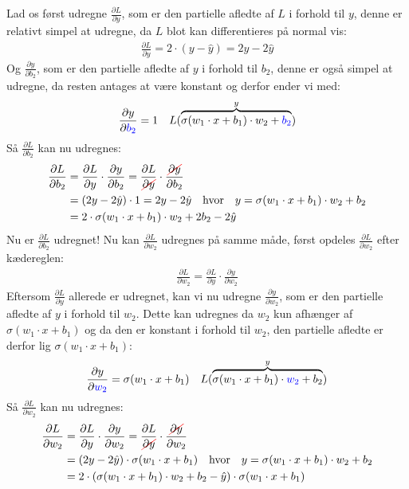 \documentclass{article}
\newcommand\Ccancel[2][black]{
    \let\OldcancelColor\CancelColor
    \renewcommand\CancelColor{\color{#1}}
    \cancel{#2}
    \renewcommand\CancelColor{\OldcancelColor}
}
\begin{document}
Lad os først udregne $\frac{\partial L}{\partial y}$, som er den partielle afledte af $L$ i forhold til $y$, denne er relativt simpel at udregne, da $L$ blot kan differentieres på normal vis:
\begin{align}
  \frac{\partial L}{\partial y} = 2 \cdot (y - \hat{y}) = 2y - 2\hat{y}
\end{align}
Og $\frac{\partial y}{\partial b_2}$, som er den partielle afledte af $y$ i forhold til $b_2$, denne er også simpel at udregne, da resten antages at være konstant og derfor ender vi med:
\begin{align}
  \frac{\partial y}{\partial {\color{blue}b_2}} = 1 && L(\overbrace{\sigma(w_1 \cdot x + b_1) \cdot w_2 + {\color{blue}b_2} }^{y} )
\end{align}
Så $\frac{\partial L}{\partial b_2}$ kan nu udregnes:
\begin{align}
  \frac{\partial L}{\partial b_2} &= \frac{\partial L}{\partial y} \cdot \frac{\partial y}{\partial b_2} = \frac{\partial L}{\Ccancel[red]{\partial y}} \cdot \frac{\Ccancel[red]{\partial y}}{\partial b_2}\\
  &= (2y - 2\hat{y}) \cdot 1 = 2y - 2\hat{y} \quad\text{hvor}\quad y = \sigma(w_1 \cdot x + b_1) \cdot w_2 + b_2\\
  &= 2\cdot\sigma(w_1 \cdot x + b_1) \cdot w_2 + 2b_2 - 2\hat{y}
\end{align}
Nu er $\frac{\partial L}{\partial b_2}$ udregnet! Nu kan $\frac{\partial L}{\partial w_2}$ udregnes på samme måde, først opdeles $\frac{\partial L}{\partial w_2}$ efter kædereglen:
\begin{align}
  \frac{\partial L}{\partial w_2} = \frac{\partial L}{\partial y} \cdot \frac{\partial y}{\partial w_2}
\end{align}
Eftersom $\frac{\partial L}{\partial y}$ allerede er udregnet, kan vi nu udregne $\frac{\partial y}{\partial w_2}$, som er den partielle afledte af $y$ i forhold til $w_2$. Dette kan udregnes da $w_2$ kun afhænger af $\sigma(w_1 \cdot x + b_1)$ og da den er konstant i forhold til $w_2$, den partielle afledte er derfor lig $\sigma(w_1 \cdot x + b_1)$:
\begin{align}
  \frac{\partial y}{\partial {\color{blue}w_2}} = \sigma(w_1 \cdot x + b_1) && L(\overbrace{\sigma(w_1 \cdot x + b_1) \cdot {\color{blue}w_2} + b_2}^{y} )
\end{align}
Så $\frac{\partial L}{\partial w_2}$ kan nu udregnes:
\begin{align}
  \frac{\partial L}{\partial w_2} &= \frac{\partial L}{\partial y} \cdot \frac{\partial y}{\partial w_2} = \frac{\partial L}{\Ccancel[red]{\partial y}} \cdot \frac{\Ccancel[red]{\partial y}}{\partial w_2}\\
  &= (2y - 2\hat{y}) \cdot \sigma(w_1 \cdot x + b_1) \quad\text{hvor}\quad y = \sigma(w_1 \cdot x + b_1) \cdot w_2 + b_2\\
  &= 2\cdot(\sigma(w_1 \cdot x + b_1) \cdot w_2 + b_2 - \hat{y}) \cdot \sigma(w_1 \cdot x + b_1)
\end{align}
\end{document}
